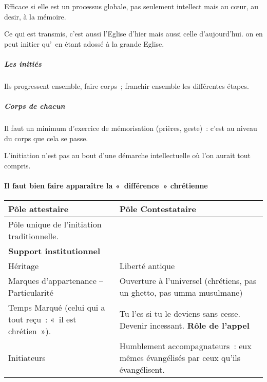 Efficace si elle est un processus globale, pas seulement intellect mais
au cœur, au desir, à la mémoire.

Ce qui est transmis, c'est aussi l'Eglise d'hier mais aussi celle
d'aujourd'hui. on en peut initier qu'~en étant adossé à la grande
Eglise.

\hypertarget{les-initiuxe9s}{%
\subparagraph{Les initiés}\label{les-initiuxe9s}}

Ils progressent ensemble, faire corps~; franchir ensemble les
différentes étapes.

\hypertarget{corps-de-chacun}{%
\subparagraph{Corps de chacun}\label{corps-de-chacun}}

Il faut un minimum d'exercice de mémorisation (prières, geste)~: c'est
au niveau du corps que cela se passe.

L'initiation n'est pas au bout d'une démarche intellectuelle où l'on
aurait tout compris.

\hypertarget{il-faut-bien-faire-apparauxeetre-la-diffuxe9rence-chruxe9tienne}{%
\paragraph{Il faut bien faire apparaître la «~différence~»
chrétienne}\label{il-faut-bien-faire-apparauxeetre-la-diffuxe9rence-chruxe9tienne}}

\begin{table}[h!]
    \centering
    \sidecaption{  }
 
\begin{tabular}{p{}p{}}
\toprule
\textbf{Pôle attestaire} & \textbf{Pôle Contestataire} \\
 \midrule
Pôle unique de l'initiation traditionnelle.\\
\textbf{Support institutionnel} 
 & \\
Héritage & Liberté antique \\
Marques d'appartenance -- Particularité & Ouverture à l'universel
(chrétiens, pas un ghetto, pas umma musulmane) \\
Temps Marqué (celui qui a tout reçu~: «~il est chrétien~»). & Tu l'es si
tu le deviens sans cesse. Devenir incessant. \textbf{Rôle de l'appel} \\
Initiateurs & Humblement accompagnateurs~: eux mêmes évangélisés par
ceux qu'ils évangélisent. \\
\bottomrule
\end{tabular}
\label{tab:my_label}
\end{table}
 

